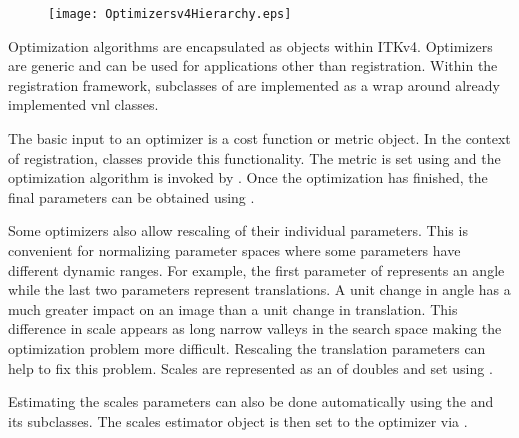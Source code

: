 


\begin{figure}
\centering
\texttt{[image: Optimizersv4Hierarchy.eps]}
\label{fig:Optimizersv4Hierarchy}
\end{figure}

Optimization algorithms are encapsulated as 
objects within ITKv4. Optimizers are generic and can be used for applications
other than registration. Within the registration framework, subclasses of
 are implemented as a wrap
around already implemented vnl classes.


The basic input to an optimizer is a cost function or metric object. In the context
of registration,  classes provide this functionality.
The metric is set using  and
the optimization algorithm is invoked by .
Once the optimization has finished, the final parameters can be obtained
using .

Some optimizers also allow rescaling of their individual parameters. This is
convenient for normalizing parameter spaces where some parameters have
different dynamic ranges. For example, the first parameter of
 represents an angle while the last two parameters
represent translations. A unit change in angle has a much greater impact on an
image than a unit change in translation. This difference in scale appears as
long narrow valleys in the search space making the optimization problem more
difficult. Rescaling the translation parameters can help to fix this problem.
Scales are represented as an  of doubles and set using
.

Estimating the scales parameters can also be done automatically using the
 and its subclasses.
The scales estimator object is then set to the optimizer via
.

